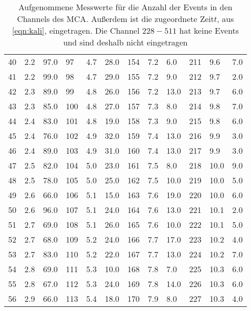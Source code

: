 \begin{table}
{\begin{tabular}{@{}lll|lll|lll|lll@{}}
     40 & 2.2 & 97.0 & 97 & 4.7 & 28.0 & 154 & 7.2 & 6.0 & 211 & 9.6 & 7.0  \\ 
     41 & 2.2 & 99.0 & 98 & 4.7 & 29.0 & 155 & 7.2 & 9.0 & 212 & 9.7 & 2.0  \\ 
     42 & 2.3 & 89.0 & 99 & 4.8 & 26.0 & 156 & 7.2 & 13.0 & 213 & 9.7 & 6.0  \\ 
     43 & 2.3 & 85.0 & 100 & 4.8 & 27.0 & 157 & 7.3 & 8.0 & 214 & 9.8 & 7.0  \\ 
     44 & 2.4 & 83.0 & 101 & 4.8 & 19.0 & 158 & 7.3 & 9.0 & 215 & 9.8 & 6.0  \\ 
     45 & 2.4 & 76.0 & 102 & 4.9 & 32.0 & 159 & 7.4 & 13.0 & 216 & 9.9 & 3.0  \\ 
     46 & 2.4 & 89.0 & 103 & 4.9 & 31.0 & 160 & 7.4 & 13.0 & 217 & 9.9 & 3.0  \\ 
     47 & 2.5 & 82.0 & 104 & 5.0 & 23.0 & 161 & 7.5 & 8.0 & 218 & 10.0 & 9.0  \\ 
     48 & 2.5 & 78.0 & 105 & 5.0 & 25.0 & 162 & 7.5 & 10.0 & 219 & 10.0 & 5.0  \\ 
     49 & 2.6 & 66.0 & 106 & 5.1 & 15.0 & 163 & 7.6 & 19.0 & 220 & 10.0 & 6.0  \\ 
     50 & 2.6 & 96.0 & 107 & 5.1 & 24.0 & 164 & 7.6 & 13.0 & 221 & 10.1 & 2.0  \\ 
     51 & 2.7 & 69.0 & 108 & 5.1 & 26.0 & 165 & 7.6 & 10.0 & 222 & 10.1 & 5.0  \\ 
     52 & 2.7 & 68.0 & 109 & 5.2 & 24.0 & 166 & 7.7 & 17.0 & 223 & 10.2 & 4.0  \\ 
     53 & 2.7 & 83.0 & 110 & 5.2 & 22.0 & 167 & 7.7 & 13.0 & 224 & 10.2 & 7.0  \\ 
     54 & 2.8 & 69.0 & 111 & 5.3 & 10.0 & 168 & 7.8 & 7.0 & 225 & 10.3 & 6.0  \\ 
     55 & 2.8 & 67.0 & 112 & 5.3 & 24.0 & 169 & 7.8 & 14.0 & 226 & 10.3 & 6.0  \\ 
     56 & 2.9 & 66.0 & 113 & 5.4 & 18.0 & 170 & 7.9 & 8.0 & 227 & 10.3 & 4.0  \\ 
    \end{tabular}}
    \caption{ Aufgenommene Messwerte für die Anzahl der Events in den Channels des MCA. Außerdem ist die zugeordnete Zeit$t$, aus \ref{eqn:kali}, eingetragen. Die Channel $228-511$ hat keine Events und sind deshalb nicht eingetragen }
    \label{tab:Lebensdauer}
\end{table}
